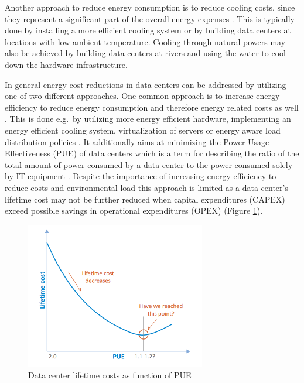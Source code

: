 Another approach to reduce energy consumption is to reduce cooling costs, since they represent a significant part of the overall energy expenses \cite{patterson2008effect}. This is typically done by installing a more efficient cooling system or by building data centers at locations with low ambient temperature. Cooling through natural powers may also be achieved by building data centers at rivers and using the water to cool down the hardware infrastructure. 

In general energy cost reductions in data centers can be addressed by utilizing one of two different approaches. One common approach is to increase energy efficiency to reduce energy consumption and therefore energy related costs as well \cite{lee2012energy, beloglazov2012energy, berl2010energy, buyya2010energy}. This is done e.g.~by utilizing more energy efficient hardware, implementing an energy efficient cooling system, virtualization of servers or energy aware load distribution policies \cite{patterson2008effect, liu2009greencloud, berl2010energy}. It additionally aims at minimizing the Power Usage Effectiveness (PUE) of data centers which is a term for describing the ratio of the total amount of power consumed by a data center to the power consumed solely by IT equipment \cite{avelar2012pue}. 
Despite the importance of increasing energy efficiency to reduce costs and environmental load this approach is limited as a data center's lifetime cost may not be further reduced when capital expenditures (CAPEX) exceed possible savings in operational expenditures (OPEX) (Figure \ref{fig:decrease_of_pue}). 


\begin{figure}[htbp]
	\centering
		\includegraphics[width=0.70\textwidth]{figures/introduction/decrease_of_pue.PNG}
	\caption{Data center lifetime costs as function of PUE \cite{dcw2013optimizing}}
	\label{fig:decrease_of_pue}
\end{figure}


